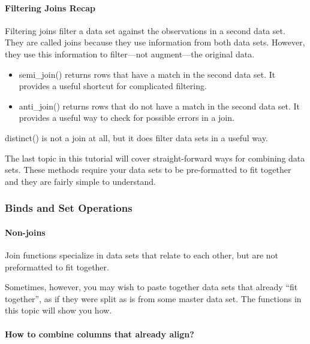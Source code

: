 \documentclass[
]{article}
\providecommand{\tightlist}{%
  \setlength{\itemsep}{0pt}\setlength{\parskip}{0pt}}
\begin{document}
\hypertarget{filtering-joins-recap}{%
\paragraph{Filtering Joins Recap}\label{filtering-joins-recap}}

Filtering joins filter a data set against the observations in a second
data set. They are called joins because they use information from both
data sets. However, they use this information to filter---not
augment---the original data.

\begin{itemize}
\tightlist
\item
  semi\_join() returns rows that have a match in the second data set. It
  provides a useful shortcut for complicated filtering.
\item
  anti\_join() returns rows that do not have a match in the second data
  set. It provides a useful way to check for possible errors in a join.
\end{itemize}

distinct() is not a join at all, but it does filter data sets in a
useful way.

The last topic in this tutorial will cover straight-forward ways for
combining data sets. These methods require your data sets to be
pre-formatted to fit together and they are fairly simple to understand.

\hypertarget{binds-and-set-operations}{%
\subsubsection{Binds and Set
Operations}\label{binds-and-set-operations}}

\hypertarget{non-joins}{%
\paragraph{Non-joins}\label{non-joins}}

Join functions specialize in data sets that relate to each other, but
are not preformatted to fit together.

Sometimes, however, you may wish to paste together data sets that
already ``fit together'', as if they were split as is from some master
data set. The functions in this topic will show you how.

\hypertarget{how-to-combine-columns-that-already-align}{%
\paragraph{How to combine columns that already
align?}\label{how-to-combine-columns-that-already-align}}
\end{document}
